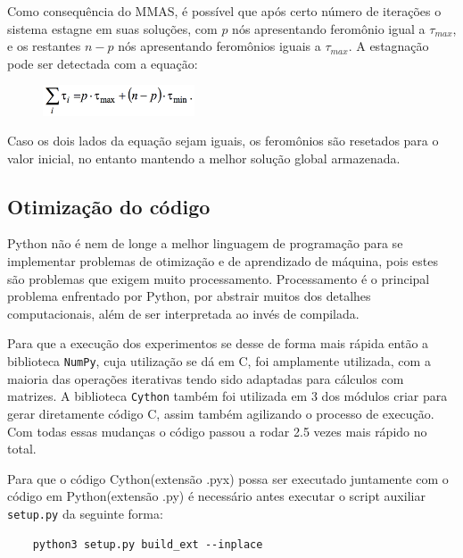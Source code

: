 Como consequência do MMAS, é possível que após certo número de iterações o sistema estagne em suas soluções, com $p$ nós apresentando feromônio igual a $\tau_{max}$, e os restantes $n - p$ nós apresentando feromônios iguais a $\tau_{max}$. A estagnação pode ser detectada com a equação:

\begin{figure}[H]	
  \centering
  \includegraphics[width=4.5cm,keepaspectratio]{images/stagnation.png}
\end{figure}

Caso os dois lados da equação sejam iguais, os feromônios são resetados para o valor inicial, no entanto mantendo a melhor solução global armazenada.

\subsection{Otimização do código}
Python não é nem de longe a melhor linguagem de programação para se implementar problemas de otimização e de aprendizado de máquina, pois estes são problemas que exigem muito processamento. Processamento é o principal problema enfrentado por Python, por abstrair muitos dos detalhes computacionais, além de ser interpretada ao invés de compilada. 

Para que a execução dos experimentos se desse de forma mais rápida então a biblioteca \texttt{NumPy}, cuja utilização se dá em C, foi amplamente utilizada, com a maioria das operações iterativas tendo sido adaptadas para cálculos com matrizes. A biblioteca \texttt{Cython} também foi utilizada em 3 dos módulos criar para gerar diretamente código C, assim também agilizando o processo de execução. Com todas essas mudanças o código passou a rodar 2.5 vezes mais rápido no total.

Para que o código Cython(extensão .pyx) possa ser executado juntamente com o código em Python(extensão .py) é necessário antes executar o script auxiliar \texttt{setup.py} da seguinte forma:

\begin{center}
\begin{verbatim}
    python3 setup.py build_ext --inplace
\end{verbatim}
\end{center}

